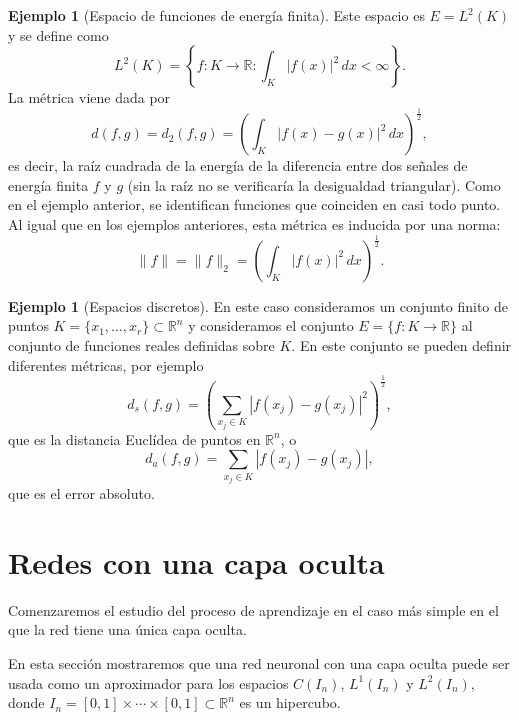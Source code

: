 \documentclass[12pt, a4paper]{amsbook}
\newcommand{\ve}{\varepsilon}
\newcommand{\R}{{\mathbb R}}
\theoremstyle{remark}
\theoremstyle{definition}
\newtheorem{ejem}[teo]{Ejemplo}
\numberwithin{section}{chapter}
\numberwithin{subsection}{section}
\numberwithin{equation}{section}
\numberwithin{figure}{chapter}
\begin{document}
\begin{ejem}[Espacio de funciones de energía finita]
Este espacio es $E=L^2(K)$ y se define como
$$
L^2(K) = \left\{f\colon K\to\R\colon \int_K |f(x)|^2\, dx <\infty\right\}.
$$
La métrica viene dada por
$$
d(f, g) = d_2(f, g) = \left(\int_K |f(x)-g(x)|^2\, dx\right)^\frac12,
$$
es decir, la raíz cuadrada de la energía de la diferencia entre dos señales de energía finita $f$ y $g$ (sin la raíz no se verificaría la desigualdad triangular). Como en el ejemplo anterior, se identifican funciones que coinciden en casi todo punto. Al igual que en los ejemplos anteriores, esta métrica es inducida por una norma:
$$
\|f\| = \|f\|_2 = \left(\int_K |f(x)|^2\, dx \right)^\frac12.
$$
\end{ejem}

\begin{ejem}[Espacios discretos]
En este caso consideramos un conjunto finito de puntos $K=\{x_1,\dots,x_r\}\subset \R^n$ y consideramos el conjunto $E=\{f\colon K\to\R\}$ al conjunto de funciones reales definidas sobre $K$. En este conjunto se pueden definir diferentes métricas, por ejemplo
$$
d_s(f, g) = \left(\sum_{x_j\in K} |f(x_j)-g(x_j)|^2\right)^\frac12,
$$
que es la distancia Euclídea de puntos en $\R^n$, o
$$
d_a(f, g) = \sum_{x_j\in K} |f(x_j)-g(x_j)|,
$$
que es el error absoluto.
\end{ejem}

%

\section{Redes con una capa oculta}\label{sec.c9.3}

Comenzaremos el estudio del proceso de aprendizaje en el caso más simple en el que la red tiene una única capa oculta.

En esta sección mostraremos que una red neuronal con una capa oculta puede ser usada como un aproximador para los espacios $C(I_n)$, $L^1(I_n)$ y $L^2(I_n)$, donde $I_n = [0, 1]\times\cdots\times [0, 1] \subset \R^n$ es un hipercubo.
\end{document}
